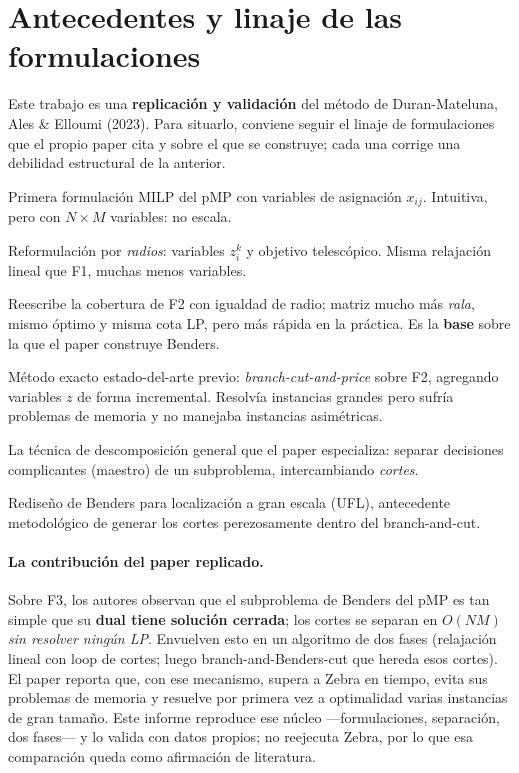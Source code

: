 \section{Antecedentes y linaje de las formulaciones}
\label{sec:literatura}

Este trabajo es una \textbf{replicación y validación} del método de Duran-Mateluna, Ales \&
Elloumi (2023). Para situarlo, conviene seguir el linaje de formulaciones que el propio paper
cita y sobre el que se construye; cada una corrige una debilidad estructural de la anterior.

\begin{description}[leftmargin=1.6em]
  \item[ReVelle \& Swain (1970) — F1.] Primera formulación MILP del pMP con variables de
        asignación $x_{ij}$. Intuitiva, pero con $N\times M$ variables: no escala.
  \item[Cornuejols, Nemhauser \& Wolsey (1980) — F2.] Reformulación por \emph{radios}: variables
        $z^k_i$ y objetivo telescópico. Misma relajación lineal que F1, muchas menos variables.
  \item[Elloumi (2010) — F3.] Reescribe la cobertura de F2 con igualdad de radio; matriz mucho
        más \emph{rala}, mismo óptimo y misma cota LP, pero más rápida en la práctica. Es la
        \textbf{base} sobre la que el paper construye Benders.
  \item[García, Labbé \& Marín (2011) — Zebra.] Método exacto estado-del-arte previo:
        \emph{branch-cut-and-price} sobre F2, agregando variables $z$ de forma incremental.
        Resolvía instancias grandes pero sufría problemas de memoria y no manejaba instancias
        asimétricas.
  \item[Benders (1962).] La técnica de descomposición general que el paper especializa: separar
        decisiones complicantes (maestro) de un subproblema, intercambiando \emph{cortes}.
  \item[Fischetti, Ljubić \& Sinnl (2017).] Rediseño de Benders para localización a gran escala
        (UFL), antecedente metodológico de generar los cortes perezosamente dentro del
        branch-and-cut.
\end{description}

\paragraph{La contribución del paper replicado.} Sobre F3, los autores observan que el
subproblema de Benders del pMP es tan simple que su \textbf{dual tiene solución cerrada}; los
cortes se separan en $O(NM)$ \emph{sin resolver ningún LP}. Envuelven esto en un algoritmo de
dos fases (relajación lineal con loop de cortes; luego branch-and-Benders-cut que hereda esos
cortes). El paper reporta que, con ese mecanismo, supera a Zebra en tiempo, evita sus problemas
de memoria y resuelve por primera vez a optimalidad varias instancias de gran tamaño. Este
informe reproduce ese núcleo —formulaciones, separación, dos fases— y lo valida con datos
propios; no reejecuta Zebra, por lo que esa comparación queda como afirmación de literatura.
